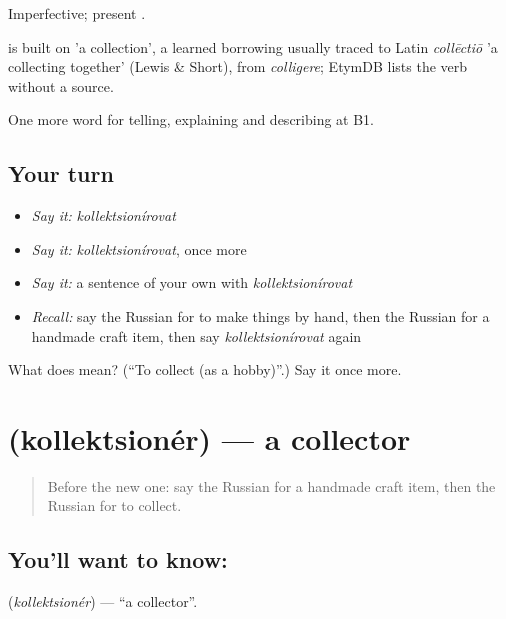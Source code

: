 Imperfective; present .

\begin{cousinweb}
\emph{} is built on \emph{} 'a collection', a learned borrowing usually traced to Latin \emph{collēctiō} 'a collecting together' (Lewis \& Short), from \emph{colligere}; EtymDB lists the verb without a source.
\end{cousinweb}

\begin{grammarlens}[title={What you've built}]
One more word for telling, explaining and describing at B1.
\end{grammarlens}

\subsection*{Your turn}
\begin{itemize}
\raggedright
  \item \emph{Say it:} \emph{kollektsionírovat}
  \item \emph{Say it:} \emph{kollektsionírovat}, once more
  \item \emph{Say it:} a sentence of your own with \emph{kollektsionírovat}
  \item \emph{Recall:} say the Russian for to make things by hand, then the Russian for a handmade craft item, then say \emph{kollektsionírovat} again
\end{itemize}

\begin{tcolorbox}[breakable,colback=teal!4,colframe=teal!35!black,title={Before you move on}]
What does  mean? (\textquotedblleft{}To collect (as a hobby)\textquotedblright{}.) Say it once more.
\end{tcolorbox}
\section[\texorpdfstring{\ru{коллекционер} (kollektsionér)}{коллекционер (kollektsionér)}]{ (kollektsionér) — a collector}

\label{lesson:RU-C503-kollektsioner}



\begin{quote}
Before the new one: say the Russian for a handmade craft item, then the Russian for to collect.
\end{quote}

\subsection*{You'll want to know: }
\textbf{} (\emph{kollektsionér}) — \textquotedblleft{}a collector\textquotedblright{}.

